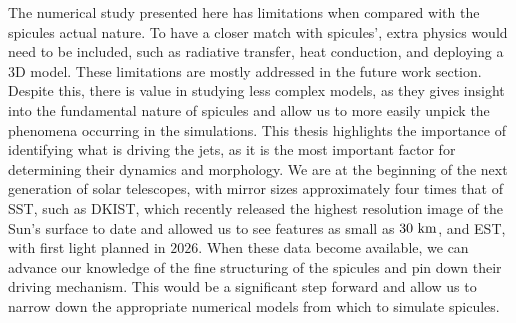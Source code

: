 \documentclass[12pt]{ociamthesis}
\begin{document}
%
The numerical study presented here has limitations when compared with the spicules actual nature. To have a closer match with spicules', extra physics would need to be included, such as radiative transfer, heat conduction, and deploying a 3D model. These limitations are mostly addressed in the future work section. Despite this, there is value in studying less complex models, as they gives insight into the fundamental nature of spicules and allow us to more easily unpick the phenomena occurring in the simulations. This thesis highlights the importance of identifying what is driving the jets, as it is the most important factor for determining their dynamics and morphology. We are at the beginning of the next generation of solar telescopes, with mirror sizes approximately four times that of SST, such as DKIST, which recently released the highest resolution image of the Sun's surface to date and allowed us to see features as small as $30~\rm{km}$, and EST, with first light planned in $2026$. When these data become available, we can advance our knowledge of the fine structuring of the spicules and pin down their driving mechanism. This would be a significant step forward and allow us to narrow down the appropriate numerical models from which to simulate spicules. 
\end{document}
